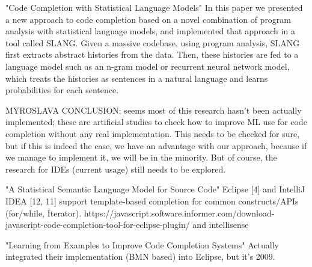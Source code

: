 "Code Completion with Statistical Language Models"
In this paper we presented a new approach to code completion based on a novel combination
of program analysis with statistical language models, and implemented that approach in a tool
called SLANG. Given a massive codebase, using program analysis, SLANG ﬁrst extracts abstract
histories from the data. Then, these histories are fed to a language model such as an n-gram
model or recurrent neural network model, which treats the histories as sentences in a natural
language and learns probabilities for each sentence.

MYROSLAVA CONCLUSION: seems most of this research hasn't been actually implemented; these are artificial
studies to check how to improve ML use for code completion without any real implementation.
This needs to be checked for sure, but if this is indeed the case, we have an advantage with our
approach, because if we manage to implement it, we will be in the minority. But of course, the
research for IDEs (current usage) still needs to be explored.

"A Statistical Semantic Language Model for Source Code"
Eclipse [4] and IntelliJ IDEA [12, 11] support template-based completion for common
constructs/APIs (for/while, Iterator).
https://javascript.software.informer.com/download-javascript-code-completion-tool-for-eclipse-plugin/
and intellisense

"Learning from Examples to Improve Code Completion Systems"
Actually integrated their implementation (BMN based) into Eclipse, but it's 2009.
